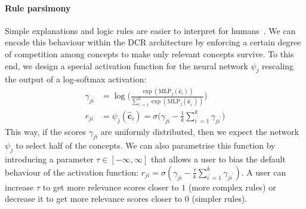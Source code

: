 \paragraph{Rule parsimony} 
Simple explanations and logic rules are easier to interpret for humans~\cite{miller1956magical,rudin2019stop}. We can encode this behaviour within the DCR architecture by enforcing a certain degree of competition among concepts to make only relevant concepts survive. To this end, we design a special activation function for the neural network $\psi_j$ rescaling the output of a log-softmax activation:
\begin{align}
    \gamma_{ji} &= \log \Bigg( \frac{\exp(\text{MLP}_j(\hat{\mathbf{c}}_i))}{\sum_{i^\prime=1}^k \exp(\text{MLP}_j(\hat{\mathbf{c}}_{i^\prime}))} \Bigg) 
    \label{eq:comp}\\
    r_{ji} &= \psi_j(\hat{\mathbf{c}}_i) = \sigma \Bigg(\gamma_{ji} - \frac{1}{k} \sum_{i^\prime=1}^k \gamma_{ji^\prime} \Bigg)\label{eq:rel}
\end{align}
This way, if the scores $\gamma_{ji}$ are uniformly distributed, then we expect the network $\psi_j$ to select half of the concepts. 
We can also parametrise this function by introducing a parameter $\tau \in [-\infty, \infty]$ that allows a user to bias the default behaviour of the activation function: 
$r_{ji} = \sigma (\gamma_{ji} - \frac{\tau}{k} \sum_{i^\prime=1}^k \gamma_{ji^\prime} )$.
A user can increase $\tau$ to get more relevance scores closer to $1$ (more complex rules) or decrease it to get more relevance scores closer to $0$ (simpler rules).












